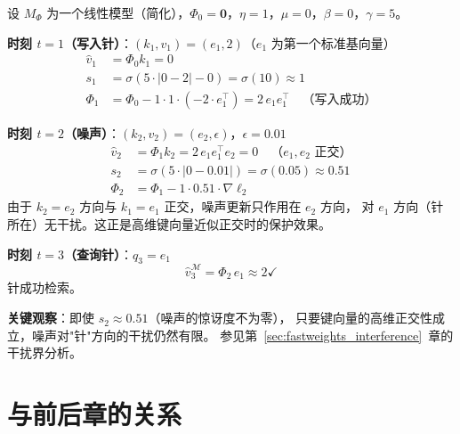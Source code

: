 \begin{example}
设 $M_\Phi$ 为一个线性模型（简化），$\Phi_0 = \mathbf{0}$，$\eta = 1$，$\mu = 0$，$\beta = 0$，$\gamma = 5$。

\textbf{时刻 $t=1$（写入针）}：$(k_1, v_1) = (e_1, 2)$（$e_1$ 为第一个标准基向量）
\begin{align*}
  \hat{v}_1 &= \Phi_0 k_1 = 0 \\
  s_1 &= \sigma(5 \cdot |0 - 2| - 0) = \sigma(10) \approx 1 \\
  \Phi_1 &= \Phi_0 - 1 \cdot 1 \cdot (-2 \cdot e_1^\top) = 2\,e_1 e_1^\top
    \quad\text{（写入成功）}
\end{align*}

\textbf{时刻 $t=2$（噪声）}：$(k_2, v_2) = (e_2, \epsilon)$，$\epsilon = 0.01$
\begin{align*}
  \hat{v}_2 &= \Phi_1 k_2 = 2\,e_1 e_1^\top e_2 = 0
    \quad\text{（$e_1, e_2$ 正交）}\\
  s_2 &= \sigma(5 \cdot |0 - 0.01|) = \sigma(0.05) \approx 0.51\\
  \Phi_2 &= \Phi_1 - 1 \cdot 0.51 \cdot \nabla\ell_2
\end{align*}
由于 $k_2 = e_2$ 方向与 $k_1 = e_1$ 正交，噪声更新只作用在 $e_2$ 方向，
对 $e_1$ 方向（针所在）无干扰。这正是高维键向量近似正交时的保护效果。

\textbf{时刻 $t=3$（查询针）}：$q_3 = e_1$
\[
  \hat{v}_3^{\mathcal{M}} = \Phi_2\,e_1 \approx 2 \checkmark
\]
针成功检索。

\textbf{关键观察}：即使 $s_2 \approx 0.51$（噪声的惊讶度不为零），
只要键向量的高维正交性成立，噪声对"针"方向的干扰仍然有限。
参见第~\ref{sec:fastweights_interference}~章的干扰界分析。
\end{example}

\section{与前后章的关系}
\label{sec:titans_bridges}

